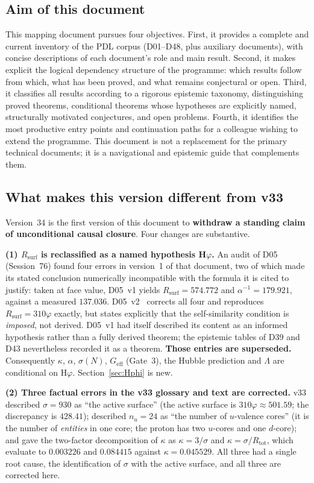 \documentclass[11pt,a4paper]{article}
\theoremstyle{plain}
\theoremstyle{definition}
\theoremstyle{remark}
\newcommand{\Geff}{G_{\mathrm{eff}}}
\newcommand{\Rsurf}{R_{\mathrm{surf}}}
\newcommand{\Rtot}{R_{\mathrm{tot}}}
\newcommand{\sigmaN}{\sigma(N)}
\begin{document}
\subsection{Aim of this document}
\label{subsec:aim}
This mapping document pursues four objectives. First, it provides a complete and current inventory of the PDL corpus (D01--D48, plus auxiliary documents), with concise descriptions of each document's role and main result. Second, it makes explicit the logical dependency structure of the programme: which results follow from which, what has been proved, and what remains conjectural or open. Third, it classifies all results according to a rigorous epistemic taxonomy, distinguishing proved theorems, conditional theorems whose hypotheses are explicitly named, structurally motivated conjectures, and open problems. Fourth, it identifies the most productive entry points and continuation paths for a colleague wishing to extend the programme. This document is not a replacement for the primary technical documents; it is a navigational and epistemic guide that complements them.

\subsection{What makes this version different from v33}
\label{subsec:diffv33}
Version~34 is the first version of this document to \textbf{withdraw a standing claim of unconditional causal closure}. Four changes are substantive.

\textbf{(1) $\Rsurf$ is reclassified as a named hypothesis H$\varphi$.} An audit of D05 (Session~76) found four errors in version~1 of that document, two of which made its stated conclusion numerically incompatible with the formula it is cited to justify: taken at face value, D05~v1 yields $\Rsurf=574.772$ and $\alpha^{-1}=179.921$, against a measured $137.036$. D05~v2~\cite{D05} corrects all four and reproduces $\Rsurf=310\varphi$ exactly, but states explicitly that the self-similarity condition is \emph{imposed}, not derived. D05~v1 had itself described its content as an informed hypothesis rather than a fully derived theorem; the epistemic tables of D39 and D43 nevertheless recorded it as a theorem. \textbf{Those entries are superseded.} Consequently $\kappa$, $\alpha$, $\sigmaN$, $\Geff$ (Gate~3), the Hubble prediction and $\Lambda$ are conditional on H$\varphi$. Section~\ref{sec:Hphi} is new.

\textbf{(2) Three factual errors in the v33 glossary and text are corrected.} v33 described $\sigma=930$ as ``the active surface'' (the active surface is $310\varphi\approx501.59$; the discrepancy is $428.41$); described $n_u=24$ as ``the number of $u$-valence cores'' (it is the number of \emph{entities} in one core; the proton has two $u$-cores and one $d$-core); and gave the two-factor decomposition of $\kappa$ as $\kappa=3/\sigma$ and $\kappa=\sigma/\Rtot$, which evaluate to $0.003226$ and $0.084415$ against $\kappa=0.045529$. All three had a single root cause, the identification of $\sigma$ with the active surface, and all three are corrected here.
\end{document}
